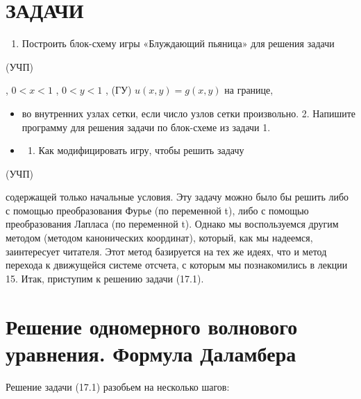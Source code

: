 \documentclass[
  ukrainian,
]{article}
\providecommand{\tightlist}{%
  \setlength{\itemsep}{0pt}\setlength{\parskip}{0pt}}
\begin{document}
\section{ЗАДАЧИ}\label{ux437ux430ux434ux430ux447ux438-3}

\begin{enumerate}
\def\labelenumi{\arabic{enumi}.}
\tightlist
\item
  Построить блок-схему игры «Блуждающий пьяница» для решения задачи
\end{enumerate}

(УЧП)

, \(0 < x < 1\) , \(0 < y < 1\) , (ГУ) \(u(x, y) = g(x, y)\) на границе,

\begin{itemize}
\tightlist
\item
  во внутренних узлах сетки, если число узлов сетки произвольно. 2.
  Напишите программу для решения задачи по блок-схеме из задачи 1.
\item
  \begin{enumerate}
  \def\labelenumi{\arabic{enumi}.}
  \setcounter{enumi}{2}
  \tightlist
  \item
    Как модифицировать игру, чтобы решить задачу
  \end{enumerate}
\end{itemize}

(УЧП)

содержащей только начальные условия. Эту задачу можно было бы решить
либо с помощью преобразования Фурье (по переменной t), либо с помощью
преобразования Лапласа (по переменной t). Однако мы воспользуемся другим
методом (методом канонических координат), который, как мы надеемся,
заинтересует читателя. Этот метод базируется на тех же идеях, что и
метод перехода к движущейся системе отсчета, с которым мы познакомились
в лекции 15. Итак, приступим к решению задачи (17.1).

\section{Решение одномерного волнового уравнения. Формула
Даламбера}\label{ux440ux435ux448ux435ux43dux438ux435-ux43eux434ux43dux43eux43cux435ux440ux43dux43eux433ux43e-ux432ux43eux43bux43dux43eux432ux43eux433ux43e-ux443ux440ux430ux432ux43dux435ux43dux438ux44f.-ux444ux43eux440ux43cux443ux43bux430-ux434ux430ux43bux430ux43cux431ux435ux440ux430}

Решение задачи (17.1) разобьем на несколько шагов:
\end{document}
